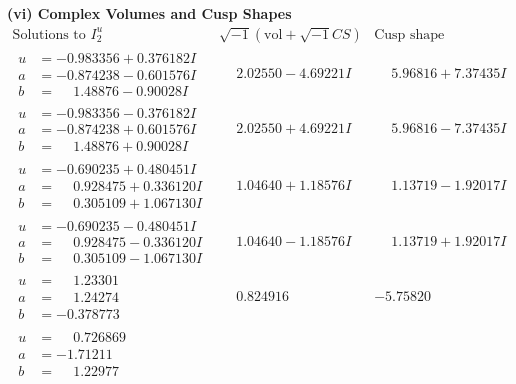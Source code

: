 \documentclass[1p]{elsarticle_modified}
\theoremstyle{definition}
\newcommand{\I}{\sqrt{-1}}
\begin{document}
\newpage\flushleft \textbf{(vi) Complex Volumes and Cusp Shapes}
$$\begin{array}{c|c|c}  
\text{Solutions to }I^u_{2}& \I (\text{vol} + \sqrt{-1}CS) & \text{Cusp shape}\\
 \hline 
\begin{aligned}
u &= -0.983356 + 0.376182 I \\
a &= -0.874238 - 0.601576 I \\
b &= \phantom{-}1.48876 - 0.90028 I\end{aligned}
 & \phantom{-}2.02550 - 4.69221 I & \phantom{-}5.96816 + 7.37435 I \\ \hline\begin{aligned}
u &= -0.983356 - 0.376182 I \\
a &= -0.874238 + 0.601576 I \\
b &= \phantom{-}1.48876 + 0.90028 I\end{aligned}
 & \phantom{-}2.02550 + 4.69221 I & \phantom{-}5.96816 - 7.37435 I \\ \hline\begin{aligned}
u &= -0.690235 + 0.480451 I \\
a &= \phantom{-}0.928475 + 0.336120 I \\
b &= \phantom{-}0.305109 + 1.067130 I\end{aligned}
 & \phantom{-}1.04640 + 1.18576 I & \phantom{-}1.13719 - 1.92017 I \\ \hline\begin{aligned}
u &= -0.690235 - 0.480451 I \\
a &= \phantom{-}0.928475 - 0.336120 I \\
b &= \phantom{-}0.305109 - 1.067130 I\end{aligned}
 & \phantom{-}1.04640 - 1.18576 I & \phantom{-}1.13719 + 1.92017 I \\ \hline\begin{aligned}
u &= \phantom{-}1.23301\phantom{ +0.000000I} \\
a &= \phantom{-}1.24274\phantom{ +0.000000I} \\
b &= -0.378773\phantom{ +0.000000I}\end{aligned}
 & \phantom{-}0.824916\phantom{ +0.000000I} & -5.75820\phantom{ +0.000000I} \\ \hline\begin{aligned}
u &= \phantom{-}0.726869\phantom{ +0.000000I} \\
a &= -1.71211\phantom{ +0.000000I} \\
b &= \phantom{-}1.22977\phantom{ +0.000000I}\end{aligned}

\end{array}$$
\end{document}
